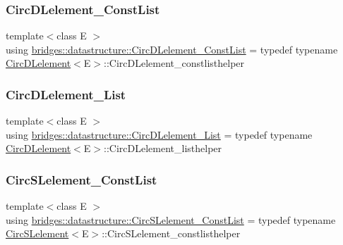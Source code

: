 \subsubsection{\texorpdfstring{Circ\+D\+Lelement\+\_\+\+Const\+List}{CircDLelement\_ConstList}}
{\footnotesize\ttfamily template$<$class E $>$ \\
using \hyperlink{namespacebridges_1_1datastructure_a72ff4f4c6720d9c7f9fb29141cc341c1}{bridges\+::datastructure\+::\+Circ\+D\+Lelement\+\_\+\+Const\+List} = typedef typename \hyperlink{classbridges_1_1datastructure_1_1_circ_d_lelement}{Circ\+D\+Lelement}$<$E$>$\+::Circ\+D\+Lelement\+\_\+constlisthelper}

\mbox{\label{namespacebridges_1_1datastructure_ab12c4e35f7131413ee6a5759273d94ac}} 
\subsubsection{\texorpdfstring{Circ\+D\+Lelement\+\_\+\+List}{CircDLelement\_List}}
{\footnotesize\ttfamily template$<$class E $>$ \\
using \hyperlink{namespacebridges_1_1datastructure_ab12c4e35f7131413ee6a5759273d94ac}{bridges\+::datastructure\+::\+Circ\+D\+Lelement\+\_\+\+List} = typedef typename \hyperlink{classbridges_1_1datastructure_1_1_circ_d_lelement}{Circ\+D\+Lelement}$<$E$>$\+::Circ\+D\+Lelement\+\_\+listhelper}

\mbox{\label{namespacebridges_1_1datastructure_a607154461f3493b40cb0c0b6217d97cb}} 
\subsubsection{\texorpdfstring{Circ\+S\+Lelement\+\_\+\+Const\+List}{CircSLelement\_ConstList}}
{\footnotesize\ttfamily template$<$class E $>$ \\
using \hyperlink{namespacebridges_1_1datastructure_a607154461f3493b40cb0c0b6217d97cb}{bridges\+::datastructure\+::\+Circ\+S\+Lelement\+\_\+\+Const\+List} = typedef typename \hyperlink{classbridges_1_1datastructure_1_1_circ_s_lelement}{Circ\+S\+Lelement}$<$E$>$\+::Circ\+S\+Lelement\+\_\+constlisthelper}

